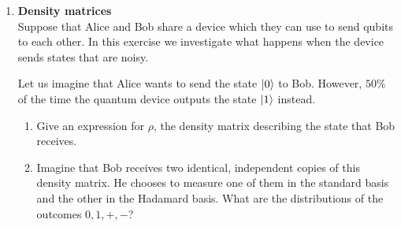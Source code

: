 \documentclass[12pt]{article}
\begin{document}
\begin{enumerate}
\item {\bf Density matrices}\\
Suppose that Alice and Bob share a device which they can use to send qubits to each other. In this exercise we  investigate what happens when the device sends states that are noisy.

Let us imagine that Alice wants to send the state $\ket{0}$ to Bob. However, $50\%$ of the time the quantum device outputs the state $\ket{1}$ instead. 
\begin{enumerate}
\item Give an expression for $\rho$, the density matrix describing the state that Bob receives.
\item Imagine that Bob receives two identical, independent copies of this density matrix. He chooses to measure one of them in the standard basis and the other in the Hadamard basis. What are the distributions of the outcomes $0,1,+,-$?

\end{enumerate}
\end{enumerate}
\end{document}
